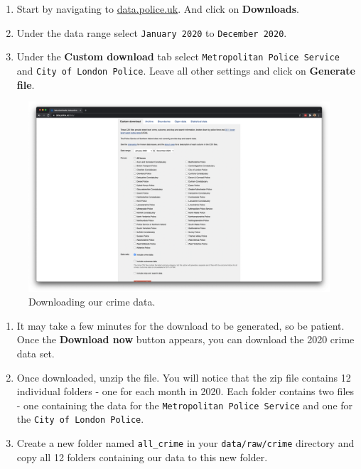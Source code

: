 \documentclass[
]{book}
\providecommand{\tightlist}{%
  \setlength{\itemsep}{0pt}\setlength{\parskip}{0pt}}
\begin{document}
\begin{enumerate}
\def\labelenumi{\arabic{enumi}.}
\tightlist
\item
  Start by navigating to \href{https://data.police.uk/}{data.police.uk}. And click on \textbf{Downloads}.
\item
  Under the data range select \texttt{January\ 2020} to \texttt{December\ 2020}.
\item
  Under the \textbf{Custom download} tab select \texttt{Metropolitan\ Police\ Service} and \texttt{City\ of\ London\ Police}. Leave all other settings and click on \textbf{Generate file}.
\end{enumerate}

\begin{figure}

{\centering \includegraphics[width=30.06in]{images/w04/download-crime} 

}

\caption{Downloading our crime data.}\label{fig:04-download-crimes}
\end{figure}

\begin{enumerate}
\def\labelenumi{\arabic{enumi}.}
\setcounter{enumi}{2}
\tightlist
\item
  It may take a few minutes for the download to be generated, so be patient. Once the \textbf{Download now} button appears, you can download the 2020 crime data set.
\item
  Once downloaded, unzip the file. You will notice that the zip file contains 12 individual folders - one for each month in 2020. Each folder contains two files - one containing the data for the \texttt{Metropolitan\ Police\ Service} and one for the \texttt{City\ of\ London\ Police}.
\item
  Create a new folder named \texttt{all\_crime} in your \texttt{data/raw/crime} directory and copy all 12 folders containing our data to this new folder.
\end{enumerate}
\end{document}
